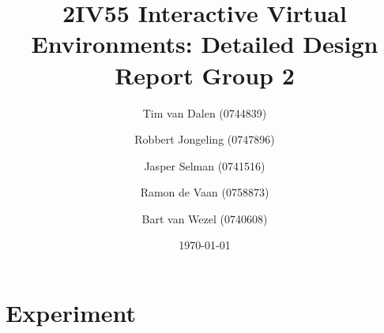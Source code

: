 \documentclass[a4paper,11pt]{article}
\title{
	2IV55 Interactive Virtual Environments: Detailed Design Report Group 2
}
\author{
	Tim van Dalen (0744839)
	\and
	Robbert Jongeling (0747896)
	\and
	Jasper Selman (0741516)
	\and
	Ramon de Vaan (0758873)
	\and
	Bart van Wezel (0740608)
}
\date{\today}
\begin{document}
	\maketitle
	
	\section{Experiment}
	\label{sec:problem}
	
	
	
	
\end{document}
